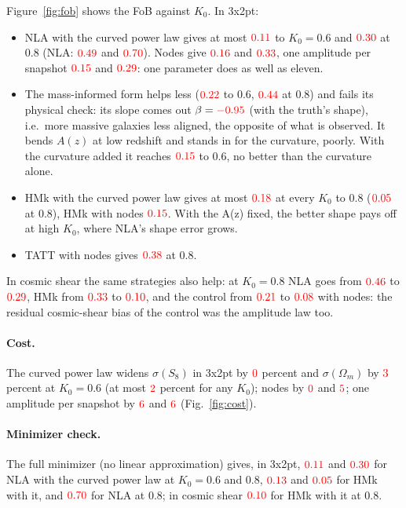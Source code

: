 \documentclass[11pt]{article}
\newcommand{\Om}{\Omega_m}
\newif\ifnumbersfinal
\newcommand{\refresh}[1]{\ifnumbersfinal#1\else\textcolor{red}{#1}\fi}
\begin{document}
Figure~\ref{fig:fob} shows the FoB against $K_0$. In 3x2pt:
\begin{itemize}
\item NLA with the curved power law gives at most
$\refresh{\fobTxQMaxSix}$ to $K_0=0.6$ and $\refresh{\fobTxQEight}$ at 0.8
(NLA: $\refresh{\fobTxNlaSix}$ and $\refresh{\fobTxNlaEight}$). Nodes give
$\refresh{\fobTxNdMaxSix}$ and $\refresh{\fobTxNdEight}$, one amplitude per
snapshot $\refresh{\fobTxSnMaxSix}$ and $\refresh{\fobTxSnEight}$: one
parameter does as well as eleven.
\item The mass-informed form helps less ($\refresh{\fobTxMMaxSix}$ to 0.6,
$\refresh{\fobTxMEight}$ at 0.8) and fails its physical check: its
slope comes out $\beta=\refresh{\betaCtrl}$ (with the truth's shape), i.e.\
more massive galaxies less aligned, the opposite of what is observed. It
bends $A(z)$ at low redshift and stands in for the curvature, poorly. With
the curvature added it reaches $\refresh{\fobTxMqMaxSix}$ to 0.6, no
better than the curvature alone.
\item HMk with the curved power law gives at most
$\refresh{\fobTxHmkQMax}$ at every $K_0$ to 0.8 ($\refresh{\fobTxHmkQEight}$
at 0.8), HMk with nodes $\refresh{\fobTxHmkNdMax}$. With the A(z) fixed,
the better shape pays off at high $K_0$, where NLA's shape error grows.
\item TATT with nodes gives $\refresh{\fobTxTattNdEight}$ at 0.8.
\end{itemize}
In cosmic shear the same strategies also help: at $K_0=0.8$ NLA goes from
$\refresh{\fobCsNlaEight}$ to $\refresh{\fobCsQEight}$, HMk from
$\refresh{\fobCsHmkEight}$ to $\refresh{\fobCsHmkQEight}$, and the control
from $\refresh{\fobCsCtrlEight}$ to $\refresh{\fobCsCtrlNdEight}$ with
nodes: the residual cosmic-shear bias of the control was the amplitude
law too.

\paragraph{Cost.} The curved power law widens $\sigma(S_8)$ in 3x2pt by
$\refresh{\costTxQS}$ percent and $\sigma(\Om)$ by $\refresh{\costTxQO}$
percent at $K_0=0.6$ (at most $\refresh{\costTxQSMax}$ percent for any
$K_0$); nodes by $\refresh{\costTxNdS}$ and $\refresh{\costTxNdO}$; one
amplitude per snapshot by $\refresh{\costTxSnS}$ and $\refresh{\costTxSnO}$
(Fig.~\ref{fig:cost}).

\paragraph{Minimizer check.} The full minimizer (no linear approximation)
gives, in 3x2pt, $\refresh{\minFobQSix}$ and $\refresh{\minFobQEight}$ for
NLA with the curved power law at $K_0=0.6$ and 0.8,
$\refresh{\minFobHmkQSix}$ and $\refresh{\minFobHmkQEight}$ for HMk with it,
and $\refresh{\minFobNlaEight}$ for NLA at 0.8; in cosmic shear
$\refresh{\minFobCsHmkQEight}$ for HMk with it at 0.8.
\end{document}
